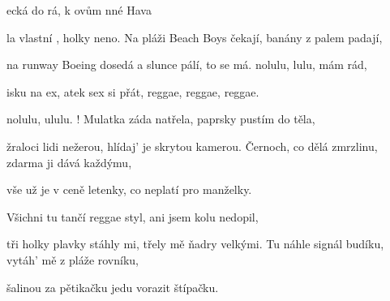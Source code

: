 

\zs

ecká  do rá, 
k ovům nné Hava 

la  vlastní ,
 holky  neno.   
\ks
\zs
Na pláži Beach Boys čekají,
banány z palem padají,

na runway Boeing dosedá
a slunce pálí, to se má.
\ks
\zr
{}nolulu, lulu,  mám rád,

isku na ex, atek sex si  přát,
reggae, reggae, reggae.

nolulu, ululu. !
\kr
\zs
Mulatka záda natřela,
paprsky pustím do těla,

žraloci lidi nežerou,
hlídaj' je skrytou kamerou.
\ks
\zs
Černoch, co dělá zmrzlinu,
zdarma ji dává každýmu,

vše už je v ceně letenky,
co neplatí pro manželky.
\ks

\zr
\kr

\zs
Všichni tu tančí reggae styl,
ani jsem kolu nedopil,

tři holky plavky stáhly mi,
třely mě ňadry velkými.
\ks
\zs
Tu náhle signál budíku,
vytáh' mě z pláže rovníku,

šalinou za pětikačku
jedu vorazit štípačku.
\ks

\zr
\kr

\kp





